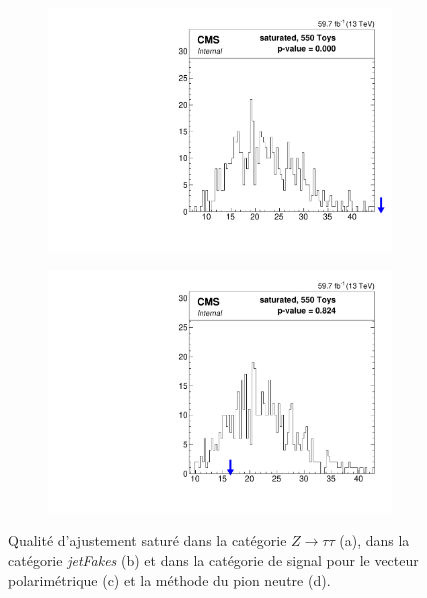 \begin{figure}
\begin{subfigure}[b]{0.5\linewidth}
        \includegraphics[scale=0.35]{Chapitre7/Images/htt_mt_3_2018-saturated.pdf} 
        \caption{} 
        \vspace{0.5ex}
    \end{subfigure}
    \begin{subfigure}[b]{0.5\linewidth}
        \centering
        \includegraphics[scale=0.35]{Chapitre7/Images/htt_mt_4_2018-saturated.pdf} 
        \caption{} 
        \vspace{0.5ex}
    \end{subfigure}
    \caption{Qualité d'ajustement saturé dans la catégorie $Z\rightarrow\tau\tau$ (a), dans la catégorie \textit{jetFakes} (b) et dans la catégorie de signal pour le vecteur polarimétrique (c) et la méthode du pion neutre (d).}
    \label{saturatedGOF}
\end{figure}

